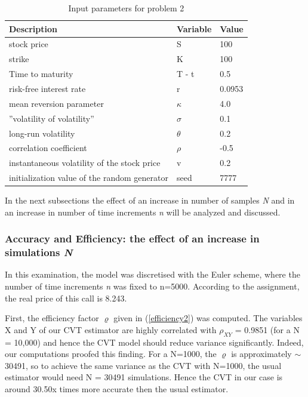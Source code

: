 \documentclass[a4paper,11pt]{article}
\begin{document}
\begin{table}[h!]
\centering
\caption{Input parameters for problem 2}
\label{my-label}
\begin{tabular}{l|l|l}
\textbf{Description} & \textbf{Variable} & \textbf{Value}  \\\hline
 stock price& S  & 100  \\
 strike& K  & 100 \\
 Time to maturity& T - t  & 0.5 \\
 risk-free interest rate& r & 0.0953 \\
mean reversion parameter& $\kappa$ & 4.0  \\
 ''volatility of volatility''& $\sigma$ & 0.1 \\
  long-run volatility& $\theta$ & 0.2 \\
   correlation coefficient& $\rho$ & -0.5 \\
   instantaneous volatility of the stock price& v & 0.2 \\
   initialization value of the random generator & seed& 7777
   
\end{tabular}
\end{table}
In the next subsections the effect of an increase in number of samples \textit{N} and in an increase in number of time increments \textit{n} will be analyzed and discussed. 

\subsubsection{Accuracy and Efficiency: the effect of an increase in simulations \textit{N}}

In this examination, the model was discretised with the Euler scheme, where the number of time increments \textit{n} was fixed to n=5000. According to the assignment, the real price of this call is 8.243.

First, the efficiency factor $\varrho$ given in (\ref{efficiency2}) was computed. The variables X and Y of our CVT estimator are highly correlated with $\rho_{XY}$  = 0.9851 (for a N = 10,000) and hence the CVT model should reduce variance significantly. Indeed, our computations proofed this finding. For a N=1000, the $\varrho$ is approximately $\sim$ 30491, so to achieve the same variance as the CVT with N=1000, the usual estimator would need N = 30491 simulations. Hence the CVT in our case is around 30.50x times more accurate then the usual estimator.
\end{document}

